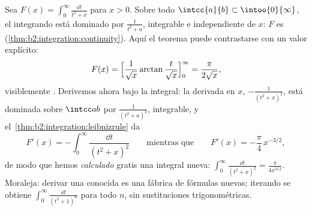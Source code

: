 \begin{example}\label{ex:b2:integration:arctanparam}
Sea $F(x) = \displaystyle\int_0^\infty \frac{\dd t}{t^2 + x}$ para
$x > 0$. Sobre todo $\intcc{a}{b} \subset \intoo{0}{\infty}$, el
integrando está dominado por $\frac{1}{t^2 + a}$, integrable e
independiente de $x$: $F$ es 
(\cref{thm:b2:integration:continuity}). Aquí el teorema puede
contrastarse con un valor explícito:
\[
F(x) = \Bigl[\frac{1}{\sqrt x}\arctan\frac{t}{\sqrt
x}\Bigr]_0^\infty = \frac{\pi}{2\sqrt x} ,
\]
visiblemente . Derivemos ahora bajo la integral: la
derivada en $x$, $-\frac{1}{(t^2+x)^2}$, está dominada sobre
$\intcc ab$ por $\frac{1}{(t^2+a)^2}$, integrable, y el~\cref{thm:b2:integration:leibnizrule} da
\[
F'(x) = -\int_0^\infty \frac{\dd t}{(t^2 + x)^2}
\qquad\text{mientras que}\qquad
F'(x) = -\frac{\pi}{4}\,x^{-3/2} ,
\]
de modo que hemos \emph{calculado} gratis una integral nueva:
$\int_0^\infty\frac{\dd t}{(t^2+x)^2} = \frac{\pi}{4x^{3/2}}$.
Moraleja: derivar una  conocida es una
fábrica de fórmulas nuevas; iterando se obtiene
$\int_0^\infty\frac{\dd t}{(t^2+1)^n}$ para todo $n$, sin
sustituciones trigonométricas.
\end{example}

